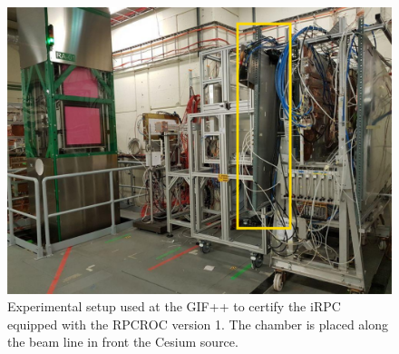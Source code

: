 \begingroup\setlength{\intextsep}{5pt}\setlength{\columnsep}{15pt}
	
	\begin{figure}
		\centering
		\includegraphics[width = 0.9\linewidth]{fig/chapt6/iRPC-RPCROC-GIFpp.png}
		\caption{\label{fig:RPCROCv1_GIFpp} Experimental setup used at the GIF++ to certify the iRPC equipped with the RPCROC version 1. The chamber is placed along the beam line in front the Cesium source.}
    \end{figure}
    
